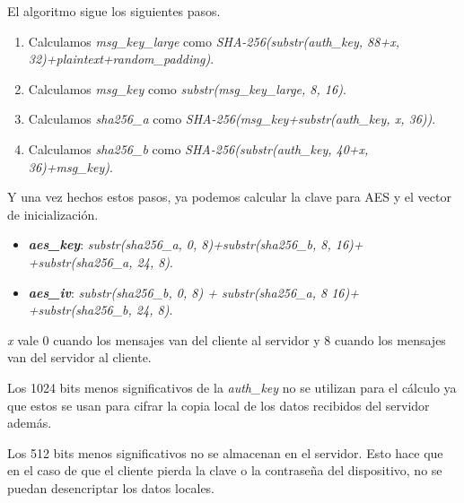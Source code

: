 El algoritmo sigue los siguientes pasos.
\begin{enumerate}
	\item Calculamos \emph{msg\_key\_large} como \emph{SHA-256(substr(auth\_key, 88+x, 32)+plaintext+random\_padding)}.
	\item Calculamos \emph{msg\_key} como \emph{substr(msg\_key\_large, 8, 16)}.
	\item Calculamos \emph{sha256\_a} como \emph{SHA-256(msg\_key+substr(auth\_key, x, 36))}.
	\item Calculamos \emph{sha256\_b} como \emph{SHA-256(substr(auth\_key, 40+x,\\ 36)+msg\_key)}.
\end{enumerate}

Y una vez hechos estos pasos, ya podemos calcular la clave para AES y el vector de inicialización.
\begin{itemize}
	\item \textbf{\emph{aes\_key}}: \emph{substr(sha256\_a, 0, 8)+substr(sha256\_b, 8, 16)+\\+substr(sha256\_a, 24, 8)}.
	\item \textbf{\emph{aes\_iv}}: \emph{substr(sha256\_b, 0, 8) + substr(sha256\_a, 8 16)+\\+substr(sha256\_b, 24, 8)}.
\end{itemize}

\emph{x} vale 0 cuando los mensajes van del cliente al servidor y 8 cuando los mensajes van del servidor al cliente.

Los 1024 bits menos significativos de la \emph{auth\_key} no se utilizan para el cálculo ya que estos se usan para cifrar la copia local de los datos recibidos del servidor además. 

Los 512 bits menos significativos no se almacenan en el servidor. Esto hace que en el caso de que el  cliente pierda la clave o la contraseña del dispositivo, no se puedan desencriptar los datos locales. 

